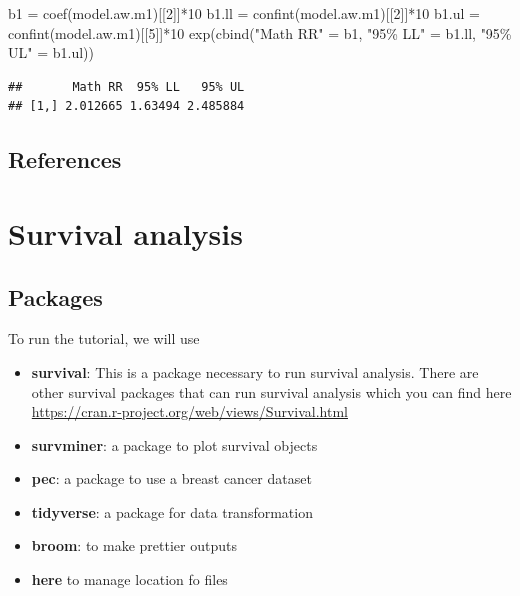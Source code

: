 \documentclass[
]{book}
\makeatletter
\newenvironment{Shaded}{\begin{snugshade}}{\end{snugshade}}
\newcommand{\DecValTok}[1]{\textcolor[rgb]{0.06,0.06,0.06}{#1}}
\newcommand{\FunctionTok}[1]{\textcolor[rgb]{0,0,0}{#1}}
\newcommand{\NormalTok}[1]{#1}
\newcommand{\OtherTok}[1]{\textcolor[rgb]{0.37,0.37,0.37}{#1}}
\newcommand{\SpecialCharTok}[1]{\textcolor[rgb]{0,0,0}{#1}}
\newcommand{\StringTok}[1]{\textcolor[rgb]{0.5,0.5,0.5}{#1}}
\providecommand{\tightlist}{%
  \setlength{\itemsep}{0pt}\setlength{\parskip}{0pt}}
\newenvironment{kframe}{%
\medskip{}
\setlength{\fboxsep}{.8em}
 \def\at@end@of@kframe{}%
 \ifinner\ifhmode%
  \def\at@end@of@kframe{\end{minipage}}%
  \begin{minipage}{\columnwidth}%
 \fi\fi%
 \def\FrameCommand##1{\hskip\@totalleftmargin \hskip-\fboxsep
 \colorbox{shadecolor}{##1}\hskip-\fboxsep
     \hskip-\linewidth \hskip-\@totalleftmargin \hskip\columnwidth}%
 \MakeFramed {\advance\hsize-\width
   \@totalleftmargin\z@ \linewidth\hsize
   \@setminipage}}%
 {\par\unskip\endMakeFramed%
 \at@end@of@kframe}
\renewenvironment{Shaded}{\begin{kframe}}{\end{kframe}}
\makeatother
\begin{document}
\begin{Shaded}
\begin{Highlighting}[]
\NormalTok{b1 }\OtherTok{=} \FunctionTok{coef}\NormalTok{(model.aw.m1)[[}\DecValTok{2}\NormalTok{]]}\SpecialCharTok{*}\DecValTok{10}
\NormalTok{b1.ll }\OtherTok{=} \FunctionTok{confint}\NormalTok{(model.aw.m1)[[}\DecValTok{2}\NormalTok{]]}\SpecialCharTok{*}\DecValTok{10}
\NormalTok{b1.ul }\OtherTok{=} \FunctionTok{confint}\NormalTok{(model.aw.m1)[[}\DecValTok{5}\NormalTok{]]}\SpecialCharTok{*}\DecValTok{10}
\FunctionTok{exp}\NormalTok{(}\FunctionTok{cbind}\NormalTok{(}\StringTok{"Math RR"} \OtherTok{=}\NormalTok{ b1, }\StringTok{"95\% LL"} \OtherTok{=}\NormalTok{ b1.ll, }\StringTok{"95\% UL"} \OtherTok{=}\NormalTok{ b1.ul))}
\end{Highlighting}
\end{Shaded}

\begin{verbatim}
##       Math RR  95% LL   95% UL
## [1,] 2.012665 1.63494 2.485884
\end{verbatim}

\hypertarget{references-1}{%
\section{References}\label{references-1}}

\hypertarget{survival-analysis}{%
\chapter{Survival analysis}\label{survival-analysis}}

\hypertarget{packages-1}{%
\section{Packages}\label{packages-1}}

To run the tutorial, we will use

\begin{itemize}
\tightlist
\item
  \textbf{survival}: This is a package necessary to run survival analysis. There are other survival packages that can run survival analysis which you can find here \url{https://cran.r-project.org/web/views/Survival.html}
\item
  \textbf{survminer}: a package to plot survival objects
\item
  \textbf{pec}: a package to use a breast cancer dataset
\item
  \textbf{tidyverse}: a package for data transformation
\item
  \textbf{broom}: to make prettier outputs
\item
  \textbf{here} to manage location fo files
\end{itemize}
\end{document}
